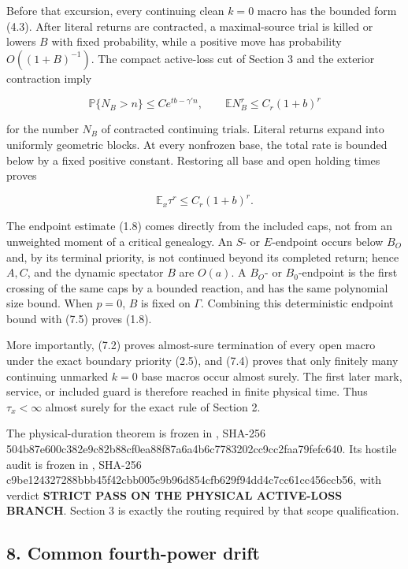 Before that excursion, every continuing clean \(k=0\) macro has the
bounded form (4.3). After literal returns are contracted, a
maximal-source trial is killed or lowers \(B\) with fixed probability,
while a positive move has probability \(O((1+B)^{-1})\). The compact
active-loss cut of Section 3 and the exterior contraction imply

\[
 \mathbb P\{N_B>n\}\le C e^{tb-\gamma'n},\qquad
 \mathbb E N_B^r\le C_r(1+b)^r                            \tag{7.4}
\]

for the number \(N_B\) of contracted continuing trials. Literal returns
expand into uniformly geometric blocks. At every nonfrozen base, the
total rate is bounded below by a fixed positive constant. Restoring all
base and open holding times proves

\[
                       \boxed{\mathbb E_x\tau^r
                                      \le C_r(1+b)^r.}      \tag{7.5}
\]

The endpoint estimate (1.8) comes directly from the included caps, not
from an unweighted moment of a critical genealogy. An \(S\)- or
\(E\)-endpoint occurs below \(B_O\) and, by its terminal priority, is
not continued beyond its completed return; hence \(A,C\), and the
dynamic spectator \(B\) are \(O(a)\). A \(B_O\)- or \(B_0\)-endpoint is
the first crossing of the same caps by a bounded reaction, and has the
same polynomial size bound. When \(p=0\), \(B\) is fixed on \(\Gamma\).
Combining this deterministic endpoint bound with (7.5) proves (1.8).

More importantly, (7.2) proves almost-sure termination of every open
macro under the exact boundary priority (2.5), and (7.4) proves that
only finitely many continuing unmarked \(k=0\) base macros occur almost
surely. The first later mark, service, or included guard is therefore
reached in finite physical time. Thus \(\tau_x<\infty\) almost surely
for the exact rule of Section 2.

The physical-duration theorem is frozen in
\texttt{}, SHA-256
504b87e600c382e9c82b88cf0ea88f87a6a4b6c7783202cc9cc2faa79fefc640. Its
hostile audit is frozen in
\texttt{},
SHA-256
c9be124327288bbb45f42cbb005c9b96d854cfb629f94dd4c7cc61cc456ccb56, with
verdict \textbf{STRICT PASS ON THE PHYSICAL ACTIVE-LOSS BRANCH}. Section
3 is exactly the routing required by that scope qualification.

\subsection{8. Common fourth-power
drift}

